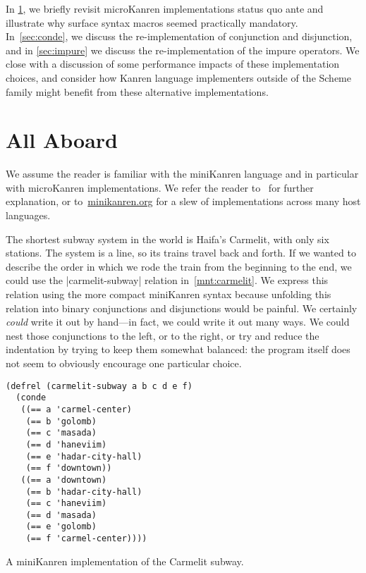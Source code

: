 \documentclass[sigplan,screen,draft,anonymous,review,natbib=false]{acmart}
\begin{document}
In \cref{sec:all-aboard}, we briefly revisit microKanren
implementations status quo ante and illustrate why surface syntax
macros seemed practically mandatory. In~\cref{sec:conde}, we discuss
the re-implementation of conjunction and disjunction, and in
\cref{sec:impure} we discuss the re-implementation of the impure
operators. We close with a discussion of some performance impacts of
these implementation choices, and consider how Kanren language
implementers outside of the Scheme family might benefit from these
alternative implementations.

\section{All Aboard}\label{sec:all-aboard}

We assume the reader is familiar with the miniKanren language and in
particular with microKanren implementations. We refer the reader
to~\cite{friedman2018reasoned,hemann2013muKanren,hemann2016small} for
further explanation, or to~\href{minikanren.org}{minikanren.org} for a
slew of implementations across many host languages.

The shortest subway system in the world is Haifa's Carmelit, with only
six stations. The system is a line, so its trains travel back and
forth. If we wanted to describe the order in which we rode the train
from the beginning to the end, we could use the
\rackinline|carmelit-subway| relation in~\cref{mnt:carmelit}. We
express this relation using the more compact miniKanren syntax because
unfolding this relation into binary conjunctions and disjunctions
would be painful. We certainly \emph{could} write it out by hand---in
fact, we could write it out many ways. We could nest those
conjunctions to the left, or to the right, or try and reduce the
indentation by trying to keep them somewhat balanced: the program
itself does not seem to obviously encourage one particular choice.

\begin{listing}
  \begin{verbatim}
(defrel (carmelit-subway a b c d e f)
  (conde
   ((== a 'carmel-center)
    (== b 'golomb)
    (== c 'masada)
    (== d 'haneviim)
    (== e 'hadar-city-hall)
    (== f 'downtown))
   ((== a 'downtown)
    (== b 'hadar-city-hall)
    (== c 'haneviim)
    (== d 'masada)
    (== e 'golomb)
    (== f 'carmel-center))))
  \end{verbatim}
  \caption{A miniKanren implementation of the Carmelit subway.}
  \label{mnt:carmelit}
\end{listing}
\end{document}
